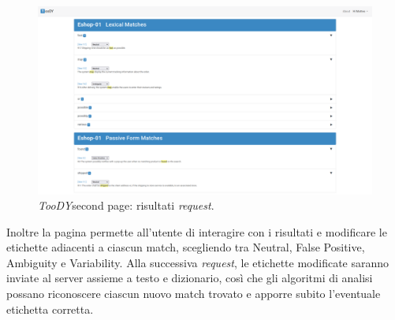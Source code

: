 \documentclass[12pt]{report}
\newcommand{\toody}{\textsl{TooDY}\xspace}
\begin{document}
\begin{figure}[H]
\centering
\includegraphics[width=1.0\textwidth]{pagina2-piena.png}
\caption{\toody \textsf{second page}: risultati \textit{request}.}
\label{fig:pagina1-login}
\end{figure}

Inoltre la pagina permette all'utente di interagire con i risultati e modificare le etichette adiacenti a ciascun match, scegliendo tra \textsf{Neutral}, \textsf{False Positive}, \textsf{Ambiguity} e \textsf{Variability}. Alla successiva \textit{request}, le etichette modificate saranno inviate al server assieme a testo e dizionario, così che gli algoritmi di analisi possano riconoscere ciascun nuovo match trovato e apporre subito l'eventuale etichetta corretta.
\end{document}
